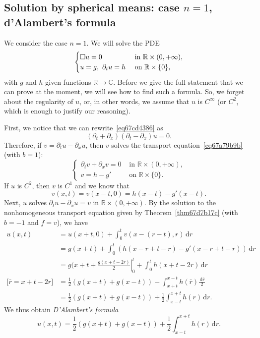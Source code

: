 \documentclass[a4paper,9pt]{amsart}
\newcommand{\R}{\mathbb{R}}	%
\newcommand{\C}{\mathbb{C}}	%
\newcommand{\did}{\,\mathrm{d}}	%
\newcommand{\de}{\partial}		%
\theoremstyle{plain}
\theoremstyle{definition}
\theoremstyle{remark}
\begin{document}
\subsection{Solution  by spherical means: case $n=1$, d'Alambert's formula}\label{subs67cd4319}
We consider the case $n=1$.
We will solve the PDE
\begin{equation}\label{eq67cd4386}
\begin{cases}
	\waveop u = 0 & \text{ in }\R\times(0,+\infty) , \\
	u = g,\ \de_tu = h & \text{ on }\R\times\{0\} ,
\end{cases}
\end{equation}
with $g$ and $h$ given functions $\R\to\C$.
Before we give the full statement that we can prove at the moment, we will see how to find such a formula.
So, we forget about the regularity of $u$, or, in other words, we assume that $u$ is $C^\infty$ (or $C^2$, which is enough to justify our reasoning).

First, we notice that we can rewrite~\eqref{eq67cd4386} as
\begin{equation}
	(\de_t+\de_x)(\de_t-\de_x) u = 0 .
\end{equation}
Therefore, if $v=\de_tu - \de_x u$, then $v$ solves the transport equation~\eqref{eq67a79b9b} (with $b=1$):
\begin{equation}
\begin{cases}
	\de_t v + \de_x v = 0 & \text{ in }\R\times(0,+\infty) , \\
	v = h-g' & \text{ on }\R\times\{0\} .
\end{cases}
\end{equation}
If $u$ is $C^2$, then $v$ is $C^1$ and we know that
\begin{equation}
	v(x,t) = v(x-t,0) = h(x-t) - g'(x-t) .
\end{equation}
Next, $u$ solves $\de_tu-\de_xu = v$ in $\R\times(0,+\infty)$.
By the solution to the nonhomogeneous transport equation given by Theorem~\ref{thm67d7b17c} (with $b=-1$ and $f=v$), we have
\begin{align*}
 	u(x,t)
	&= u(x+t,0) + \int_0^t v(x-(r-t),r) \did r \\
	&= g(x+t) + \int_0^t (h(x-r+t-r) - g'(x-r+t-r)) \did r \\
	&= g(x+t + \left. \frac{g(x+t-2r)}{2} \right|^t_0 + \int_0^t h(x+t-2r) \did r \\
	\text{[$\bar r = x+t-2r$]}
	&= \frac12 (g(x+t)+g(x-t)) - \int_{x+t}^{x-t} h(\bar r) \frac{\did \bar r}{2} \\
	&= \frac12 (g(x+t)+g(x-t)) + \frac12 \int_{x-t}^{x+t} h(r) \did r .
\end{align*}
We thus obtain \emph{D'Alambert's formula}
\begin{equation}\label{eq67cd45ee}
	u(x,t) = \frac12 (g(x+t)+g(x-t)) + \frac12 \int_{x-t}^{x+t} h(r) \did r .
\end{equation}
\end{document}
